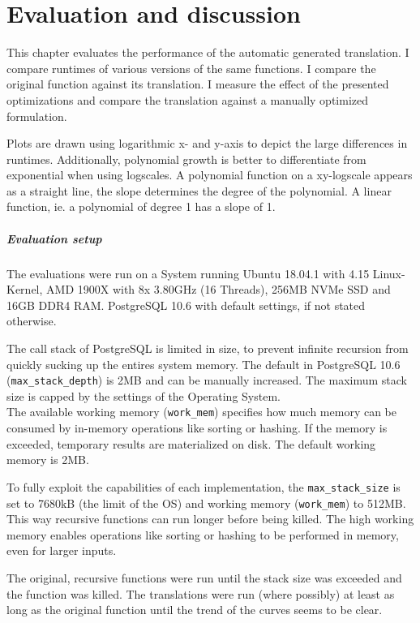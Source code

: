 \chapter{Evaluation and discussion}\label{results_discussion}

This chapter evaluates the performance of the automatic generated translation. I compare runtimes of various versions of the same functions. I compare the original function against its translation. I measure the effect of the presented optimizations and compare the translation against a manually optimized formulation.

Plots are drawn using logarithmic x- and y-axis to depict the large differences in runtimes. Additionally, polynomial growth is better to differentiate from exponential when using logscales. A polynomial function on a xy-logscale appears as a straight line, the slope determines the degree of the polynomial. A linear function, ie. a polynomial of degree 1 has a slope of 1.

\paragraph*{Evaluation setup}
The evaluations were run on a System running Ubuntu 18.04.1 with 4.15 Linux-Kernel, AMD 1900X with 8x 3.80GHz (16 Threads), 256MB NVMe SSD and 16GB DDR4 RAM. PostgreSQL 10.6 with default settings, if not stated otherwise.

The call stack of PostgreSQL is limited in size, to prevent infinite recursion from quickly sucking up the entires system memory. The default in PostgreSQL 10.6 (\texttt{max\_stack\_depth}) is 2MB and can be manually increased. The maximum stack size is capped by the settings of the Operating System.\\
The available working memory (\texttt{work\_mem}) specifies how much memory can be consumed by in-memory operations like sorting or hashing. If the memory is exceeded, temporary results are materialized on disk. The default working memory is 2MB. \cite[p. 512 ff.]{psql}

To fully exploit the capabilities of each implementation, the \texttt{max\_stack\_size} is set to 7680kB (the limit of the OS) and working memory (\texttt{work\_mem}) to 512MB. This way recursive functions can run longer before being killed. The high working memory enables operations like sorting or hashing to be performed in memory, even for larger inputs.

The original, recursive functions were run until the stack size was exceeded and the function was killed. The translations were run (where possibly) at least as long as the original function until the trend of the curves seems to be clear.

